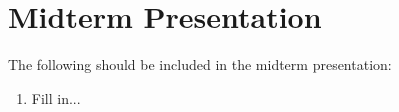\section{Midterm Presentation}

The following should be included in the midterm presentation:

\begin{enumerate}

\item Fill in...

\end{enumerate}